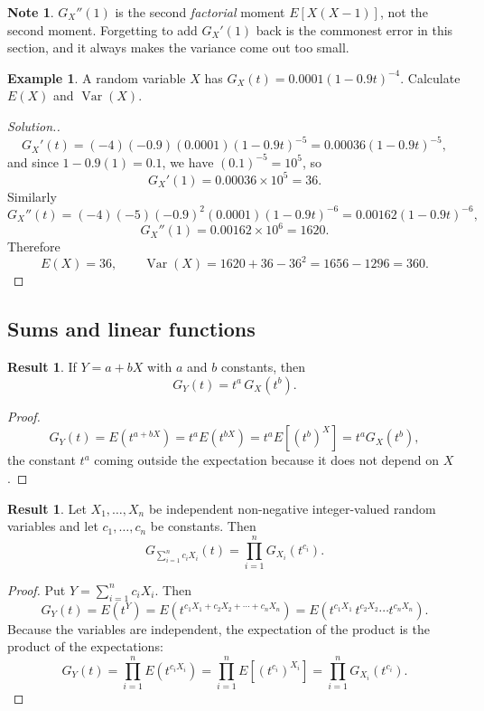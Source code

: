 \documentclass[11pt,a4paper]{article}
\theoremstyle{definition}
\newtheorem{exa}[thm]{Example}
\newtheorem{result}[thm]{Result}
\newtheorem*{note}{Note}
\newenvironment{solution}
  {\renewcommand{\qedsymbol}{}\begin{proof}[\textit{Solution}.]}
  {\end{proof}}
\DeclareMathOperator{\Var}{Var}
\begin{document}
\begin{note}
$G_X''(1)$ is the second \emph{factorial} moment $E\left[X(X-1)\right]$, not the
second moment. Forgetting to add $G_X'(1)$ back is the commonest error in this
section, and it always makes the variance come out too small.
\end{note}

\begin{exa}
A random variable $X$ has $G_X(t) = 0.0001\left(1-0.9t\right)^{-4}$. Calculate
$E(X)$ and $\Var(X)$.
\end{exa}

\begin{solution}
$$G_X'(t) = (-4)(-0.9)(0.0001)\left(1-0.9t\right)^{-5}
= 0.00036\left(1-0.9t\right)^{-5},$$
and since $1-0.9(1) = 0.1$, we have $\left(0.1\right)^{-5} = 10^{5}$, so
$$G_X'(1) = 0.00036 \times 10^{5} = 36 .$$
Similarly
$$G_X''(t) = (-4)(-5)(-0.9)^{2}(0.0001)\left(1-0.9t\right)^{-6}
= 0.00162\left(1-0.9t\right)^{-6},$$
$$G_X''(1) = 0.00162 \times 10^{6} = 1620 .$$
Therefore
$$E(X) = 36,\qquad
\Var(X) = 1620 + 36 - 36^{2} = 1656 - 1296 = 360 .$$
\end{solution}

\subsection{Sums and linear functions}

\begin{result}
If $Y = a + bX$ with $a$ and $b$ constants, then
$$G_Y(t) = t^{a}\,G_X\!\left(t^{b}\right).$$
\end{result}

\begin{proof}
$$G_Y(t) = E\left(t^{a+bX}\right) = t^{a}E\left(t^{bX}\right)
= t^{a}E\left[\left(t^{b}\right)^{X}\right] = t^{a}G_X\!\left(t^{b}\right),$$
the constant $t^{a}$ coming outside the expectation because it does not depend
on $X$.
\end{proof}

\begin{result}
Let $X_1,\dots,X_n$ be independent non-negative integer-valued random variables
and let $c_1,\dots,c_n$ be constants. Then
$$G_{\sum_{i=1}^{n}c_iX_i}(t) = \prod_{i=1}^{n} G_{X_i}\!\left(t^{c_i}\right).$$
\end{result}

\begin{proof}
Put $Y = \sum_{i=1}^{n}c_iX_i$. Then
$$G_Y(t) = E\left(t^{Y}\right)
= E\left(t^{c_1X_1 + c_2X_2 + \cdots + c_nX_n}\right)
= E\left(t^{c_1X_1}\,t^{c_2X_2}\cdots t^{c_nX_n}\right).$$
Because the variables are independent, the expectation of the product is the
product of the expectations:
$$G_Y(t) = \prod_{i=1}^{n}E\left(t^{c_iX_i}\right)
= \prod_{i=1}^{n}E\left[\left(t^{c_i}\right)^{X_i}\right]
= \prod_{i=1}^{n}G_{X_i}\!\left(t^{c_i}\right).$$
\end{proof}
\end{document}
